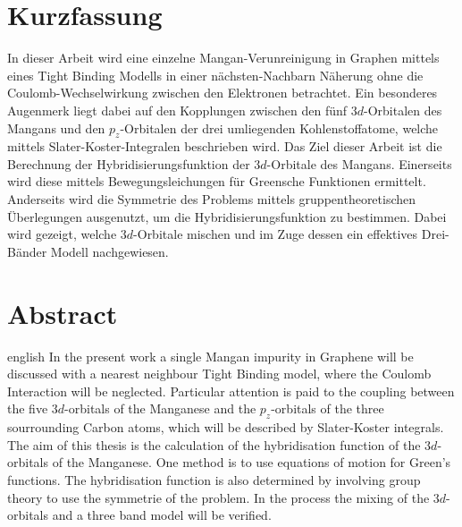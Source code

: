 \thispagestyle{plain}

\section*{Kurzfassung}
In dieser Arbeit wird eine einzelne Mangan-Verunreinigung in Graphen mittels eines Tight Binding Modells in einer nächsten-Nachbarn Näherung
ohne die Coulomb-Wechselwirkung zwischen den Elektronen betrachtet.
Ein besonderes Augenmerk liegt dabei auf den Kopplungen zwischen den fünf $3d$-Orbitalen des Mangans und den $p_z$-Orbitalen der drei umliegenden 
Kohlenstoffatome, welche mittels Slater-Koster-Integralen beschrieben wird.
Das Ziel dieser Arbeit ist die Berechnung der Hybridisierungsfunktion der $3d$-Orbitale des Mangans. 
Einerseits wird diese mittels Bewegungsleichungen für Greensche Funktionen ermittelt.
Anderseits wird die Symmetrie des Problems mittels gruppentheoretischen Überlegungen ausgenutzt, um die Hybridisierungsfunktion zu bestimmen.
Dabei wird gezeigt, welche $3d$-Orbitale mischen und im Zuge dessen ein effektives Drei-Bänder Modell nachgewiesen.
\section*{Abstract}
\begin{foreignlanguage}{english}
In the present work a single Mangan impurity in Graphene will be discussed with a nearest neighbour Tight Binding model, where
the Coulomb Interaction will be neglected.
Particular attention is paid to the coupling between the five $3d$-orbitals of the Manganese and the $p_z$-orbitals of the three
sourrounding Carbon atoms, which will be described by Slater-Koster integrals.
The aim of this thesis is the calculation of the hybridisation function of the $3d$-orbitals of the Manganese.
One method is to use equations of motion for Green's functions. 
The hybridisation function is also determined by involving group theory to use the symmetrie of the problem.
In the process the mixing of the $3d$-orbitals and a three band model will be verified. 
\end{foreignlanguage}